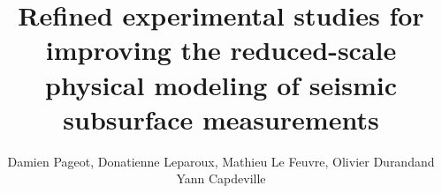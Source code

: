 \documentclass[manuscript,revised]{geophysics}
\begin{document}
\title{Refined experimental studies for improving the reduced-scale physical modeling of seismic subsurface measurements}

\renewcommand{\thefootnote}{\fnsymbol{footnote}} 


\address{
\footnotemark[1]LUNAM-IFSTTAR, \\
\footnotemark[2]OSUNA \\
\footnotemark[1]LPGN, \\}
\author{Damien Pageot\footnotemark[1]\footnotemark[2], Donatienne Leparoux\footnotemark[1], Mathieu Le Feuvre\footnotemark[1], Olivier Durand\footnotemark[1] and Yann Capdeville\footnotemark[3]}


\maketitle
\end{document}
